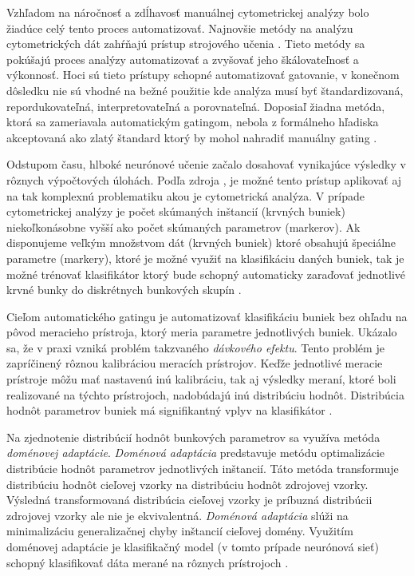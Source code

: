 Vzhľadom na náročnosť a zdĺhavosť manuálnej cytometrickej analýzy bolo žiadúce celý tento proces automatizovať. Najnovšie metódy na analýzu cytometrických dát zahŕňajú prístup strojového učenia \cite{Li2016}. Tieto metódy sa pokúšajú proces analýzy automatizovať a zvyšovať jeho škálovateľnosť a výkonnosť. Hoci sú tieto prístupy schopné automatizovať gatovanie, v konečnom dôsledku nie sú vhodné na bežné použitie kde analýza musí byť štandardizovaná, repordukovateľná, interpretovateľná a porovnateľná. Doposiaľ žiadna metóda, ktorá sa zameriavala automatickým gatingom, nebola z formálneho hľadiska akceptovaná ako zlatý štandard ktorý by mohol nahradiť manuálny gating \cite{Li2017}.

Odstupom času, hlboké neurónové učenie začalo dosahovať vynikajúce výsledky v rôznych výpočtových úlohách. Podľa zdroja \cite{Li2016}, je možné tento prístup aplikovať aj na tak komplexnú problematiku akou je cytometrická analýza. V prípade cytometrickej analýzy je počet skúmaných inštancií (krvných buniek) niekoľkonásobne vyšší ako počet skúmaných parametrov (markerov). Ak disponujeme veľkým množstvom dát (krvných buniek) ktoré obsahujú špeciálne parametre (markery), ktoré je možné využiť na klasifikáciu daných buniek, tak je možné trénovať klasifikátor ktorý bude schopný automaticky zaraďovať jednotlivé krvné bunky do diskrétnych bunkových skupín \cite{Li2016}.

Cieľom automatického gatingu je automatizovať klasifikáciu buniek bez ohľadu na pôvod meracieho prístroja, ktorý meria parametre jednotlivých buniek. Ukázalo sa, že v praxi vzniká problém takzvaného \textit{dávkového efektu}. Tento problém je zapríčinený rôznou kalibráciou meracích prístrojov. Keďže jednotlivé meracie prístroje môžu mať nastavenú inú kalibráciu, tak aj výsledky meraní, ktoré boli realizované na týchto prístrojoch, nadobúdajú inú distribúciu hodnôt. Distribúcia hodnôt parametrov buniek má signifikantný vplyv na klasifikátor \cite{Li2017}.

Na zjednotenie distribúcií hodnôt bunkových parametrov sa využíva metóda \textit{doménovej adaptácie}. \textit{Doménová adaptácia} predstavuje metódu optimalizácie distribúcie hodnôt parametrov jednotlivých inštancií. Táto metóda transformuje distribúciu hodnôt cieľovej vzorky na distribúciu hodnôt zdrojovej vzorky. Výsledná transformovaná distribúcia cieľovej vzorky je príbuzná distribúcii zdrojovej vzorky ale nie je ekvivalentná. \textit{Doménová adaptácia} slúži na minimalizáciu generalizačnej chyby inštancií cieľovej domény. Využitím doménovej adaptácie je klasifikačný model (v tomto prípade neurónová sieť) schopný klasifikovať dáta merané na rôznych prístrojoch \cite{Li2016, Li2017}.

